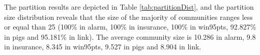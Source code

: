 The partition results are depicted in Table \ref{tab:partitionDist}, and the partition size distribution reveals that the size of the majority of communities ranges less or equal than 25 (100\% in alarm, 100\% in insurance, 100\% in win95pts, 92.827\% in pigs and 95.181\% in link). The average community size is 10.286 in alarm, 9.8 in insurance, 8.345 in win95pts, 9.527 in pigs and 8.904 in link.



